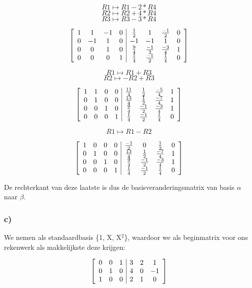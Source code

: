 \documentclass[lineaire_algebra_oplossingen.tex]{subfiles}
\begin{document}
\[R1 \mapsto R1 - 2*R4 \]
\[R2 \mapsto R2 + 4*R4 \]
\[R3 \mapsto R3 - 3*R4 \]

\[
\left[
\begin{array}{ c c c c | c c c c }
1 & 1 & -1 & 0 & \frac{1}{2} & 1 & \frac{-1}{2} & 0\\
0 & -1 & 1 & 0 & -1 & -1 & 1 & 0\\
0 & 0 & 1 & 0 & \frac{9}{4} & \frac{-1}{2} & \frac{-3}{4} & 1\\
0 & 0 & 0 & 1 & \frac{1}{4} & \frac{-1}{2} & \frac{1}{4} & 0
\end{array}
\right]
\]

\[R1 \mapsto R1 + R3 \]
\[R2 \mapsto -R2 + R3 \]

\[
\left[
\begin{array}{ c c c c | c c c c }
1 & 1 & 0 & 0 & \frac{11}{4} & \frac{1}{2} & \frac{-5}{4} & 1\\
0 & 1 & 0 & 0 & \frac{13}{4} & \frac{1}{2} & \frac{-7}{4} & 1\\
0 & 0 & 1 & 0 & \frac{9}{4} & \frac{-1}{2} & \frac{-3}{4} & 1\\
0 & 0 & 0 & 1 & \frac{1}{4} & \frac{-1}{2} & \frac{1}{4} & 0
\end{array}
\right]
\]

\[R1 \mapsto R1 - R2 \]

\[
\left[
\begin{array}{ c c c c | c c c c }
1 & 0 & 0 & 0 & \frac{-1}{2} & 0 & \frac{1}{2} & 0\\
0 & 1 & 0 & 0 & \frac{13}{4} & \frac{1}{2} & \frac{-7}{4} & 1\\
0 & 0 & 1 & 0 & \frac{9}{4} & \frac{-1}{2} & \frac{-3}{4} & 1\\
0 & 0 & 0 & 1 & \frac{1}{4} & \frac{-1}{2} & \frac{1}{4} & 0
\end{array}
\right]
\]

De rechterkant van deze laatste is dus de basisveranderingsmatrix van basis $\alpha$ naar $\beta$.

\subsubsection*{c)}
We nemen als standaardbasis \{1, X, X$^2$\}, waardoor we als beginmatrix voor ons rekenwerk als makkelijkste deze krijgen:

\[
\left[
\begin{array}{ c c c | c c c }
0 & 0 & 1 & 3 & 2 & 1\\
0 & 1 & 0 & 4 & 0 & -1\\
1 & 0 & 0 & 2 & 1 & 0
\end{array}
\right]
\]
\end{document}
